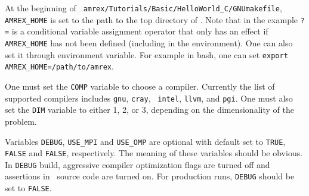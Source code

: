 At the beginning of {\tt
  amrex/Tutorials/Basic/HelloWorld\_C/GNUmakefile}, {\tt AMREX\_HOME}
is set to the path to the top directory of \amrex.  Note that in the
example {\tt ?=} is a conditional variable assignment operator that
only has an effect if {\tt AMREX\_HOME} has not been defined
(including in the environment).  One can also set it through
environment variable.  For example in bash, one can set {\tt export
  AMREX\_HOME=/path/to/amrex}.

One must set the {\tt COMP} variable to choose a compiler.  Currently
the list of supported compilers includes {\tt gnu}, {\tt cray}, {\tt
  intel}, {\tt llvm}, and {\tt pgi}.  One must also set the {\tt DIM}
variable to either 1, 2, or 3, depending on the dimensionality of the
problem. 

Variables {\tt DEBUG}, {\tt USE\_MPI} and {\tt USE\_OMP} are optional
with default set to {\tt TRUE}, {\tt FALSE} and {\tt FALSE},
respectively.  The meaning of these variables should be obvious.  In
{\tt DEBUG} build, aggressive compiler optimization flags are turned
off and assertions in \amrex\ source code are turned on.  For
production runs, {\tt DEBUG} should be set to {\tt FALSE}.

